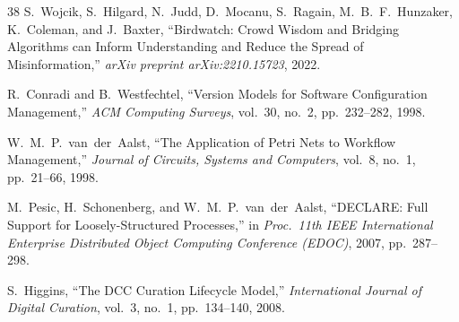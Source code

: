 \documentclass[11pt]{article}
\begin{document}
\begin{thebibliography}{38}
S.~Wojcik, S.~Hilgard, N.~Judd, D.~Mocanu, S.~Ragain, M.~B.~F.~Hunzaker, K.~Coleman, and J.~Baxter, ``Birdwatch: Crowd Wisdom and Bridging Algorithms can Inform Understanding and Reduce the Spread of Misinformation,'' \textit{arXiv preprint arXiv:2210.15723}, 2022.

R.~Conradi and B.~Westfechtel, ``Version Models for Software Configuration Management,'' \textit{ACM Computing Surveys}, vol.~30, no.~2, pp.~232--282, 1998.

W.~M.~P.~van~der~Aalst, ``The Application of Petri Nets to Workflow Management,'' \textit{Journal of Circuits, Systems and Computers}, vol.~8, no.~1, pp.~21--66, 1998.

M.~Pesic, H.~Schonenberg, and W.~M.~P.~van~der~Aalst, ``DECLARE: Full Support for Loosely-Structured Processes,'' in \textit{Proc.\ 11th IEEE International Enterprise Distributed Object Computing Conference (EDOC)}, 2007, pp.~287--298.

S.~Higgins, ``The DCC Curation Lifecycle Model,'' \textit{International Journal of Digital Curation}, vol.~3, no.~1, pp.~134--140, 2008.

\end{thebibliography}
\end{document}
